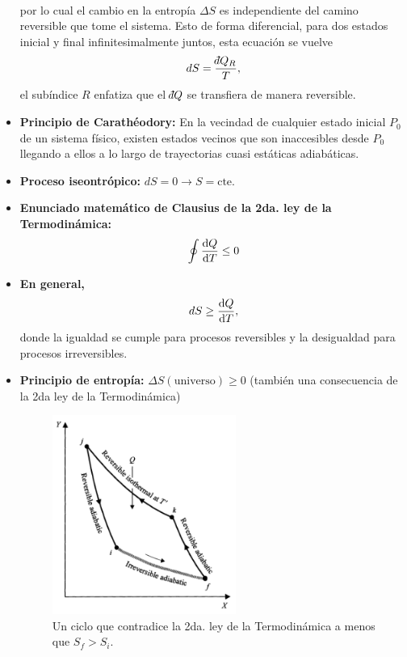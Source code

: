 \begin{itemize}
\begin{align}
\end{align}
por lo cual el cambio en la entropía $\Delta S$ es independiente
del camino reversible que tome el sistema. Esto de forma diferencial,
para dos estados inicial y final infinitesimalmente juntos, esta ecuación 
se vuelve
\begin{align}
dS=\frac{\dbar Q_R}{T},
\end{align}
el subíndice $R$ enfatiza que el $\dbar Q$ se transfiera de manera 
reversible.
\item \textbf{Principio de Carathéodory:} 
En la vecindad de cualquier estado inicial $P_0$ de un sistema
físico, existen estados vecinos que son inaccesibles desde $P_0$ 
llegando a ellos a lo largo de trayectorias cuasi estáticas adiabáticas.
\item \textbf{Proceso iseontrópico:} $dS=0\rightarrow S=\text{cte.}$
\item \textbf{Enunciado matemático de Clausius de la 
2da. ley de la Termodinámica:}
\begin{align}
\oint \dv{Q}{T}\leq 0
\end{align}
\item \textbf{En general,}
\begin{align}
dS \geq \dv{Q}{T},
\label{eq:general-dS}
\end{align}
donde la igualdad se cumple para procesos reversibles y la
desigualdad para procesos irreversibles. 
\item \textbf{Principio de entropía:} $\Delta S(\text{universo})\geq0$ 
(también una consecuencia de la 2da ley de la Termodinámica)
\begin{figure}
  \centering
  \includegraphics[width=6cm]{images/entropy-principle.png}
  \caption{Un ciclo que contradice la 2da. ley de la Termodinámica
  a menos que $S_f>S_i$.}
  \label{fig:reversible-paths}
\end{figure}
\end{itemize}
